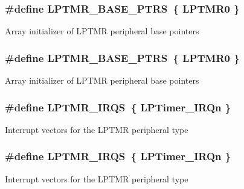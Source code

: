 \subsubsection[{\texorpdfstring{L\+P\+T\+M\+R\+\_\+\+B\+A\+S\+E\+\_\+\+P\+T\+RS}{LPTMR_BASE_PTRS}}]{\setlength{\rightskip}{0pt plus 5cm}\#define L\+P\+T\+M\+R\+\_\+\+B\+A\+S\+E\+\_\+\+P\+T\+RS~\{ {\bf L\+P\+T\+M\+R0} \}}\hypertarget{group__LPTMR__Peripheral__Access__Layer_gac92660dedc63be48d689d43efc9f2c82}{}\label{group__LPTMR__Peripheral__Access__Layer_gac92660dedc63be48d689d43efc9f2c82}
Array initializer of L\+P\+T\+MR peripheral base pointers 
\subsubsection[{\texorpdfstring{L\+P\+T\+M\+R\+\_\+\+B\+A\+S\+E\+\_\+\+P\+T\+RS}{LPTMR_BASE_PTRS}}]{\setlength{\rightskip}{0pt plus 5cm}\#define L\+P\+T\+M\+R\+\_\+\+B\+A\+S\+E\+\_\+\+P\+T\+RS~\{ {\bf L\+P\+T\+M\+R0} \}}\hypertarget{group__LPTMR__Peripheral__Access__Layer_gac92660dedc63be48d689d43efc9f2c82}{}\label{group__LPTMR__Peripheral__Access__Layer_gac92660dedc63be48d689d43efc9f2c82}
Array initializer of L\+P\+T\+MR peripheral base pointers 
\subsubsection[{\texorpdfstring{L\+P\+T\+M\+R\+\_\+\+I\+R\+QS}{LPTMR_IRQS}}]{\setlength{\rightskip}{0pt plus 5cm}\#define L\+P\+T\+M\+R\+\_\+\+I\+R\+QS~\{ {\bf L\+P\+Timer\+\_\+\+I\+R\+Qn} \}}\hypertarget{group__LPTMR__Peripheral__Access__Layer_ga5bf0032641d320fc7d486d703800c729}{}\label{group__LPTMR__Peripheral__Access__Layer_ga5bf0032641d320fc7d486d703800c729}
Interrupt vectors for the L\+P\+T\+MR peripheral type 
\subsubsection[{\texorpdfstring{L\+P\+T\+M\+R\+\_\+\+I\+R\+QS}{LPTMR_IRQS}}]{\setlength{\rightskip}{0pt plus 5cm}\#define L\+P\+T\+M\+R\+\_\+\+I\+R\+QS~\{ {\bf L\+P\+Timer\+\_\+\+I\+R\+Qn} \}}\hypertarget{group__LPTMR__Peripheral__Access__Layer_ga5bf0032641d320fc7d486d703800c729}{}\label{group__LPTMR__Peripheral__Access__Layer_ga5bf0032641d320fc7d486d703800c729}
Interrupt vectors for the L\+P\+T\+MR peripheral type 